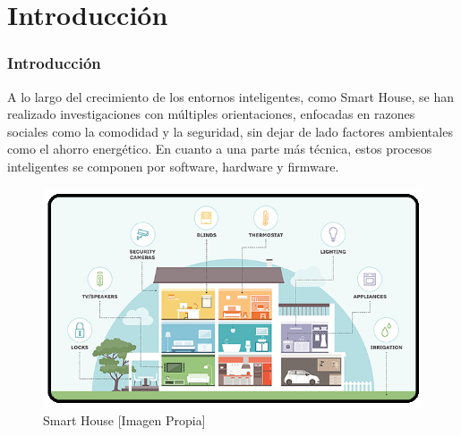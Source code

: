 \section{Introducción}
\begin{frame}
\frametitle{Introducción}
\footnotesize
 A lo largo del crecimiento de los entornos inteligentes, como Smart House, se han realizado investigaciones con múltiples orientaciones, enfocadas en razones sociales como la comodidad y la seguridad, sin dejar de lado factores ambientales como el ahorro energético. En cuanto a una parte más técnica, estos procesos inteligentes se componen por software, hardware y firmware.\newline
 
 \begin{figure}[!]
 	\centering
 	\caption{Smart House [Imagen Propia]}
 	\label{fig:intr}
 	\includegraphics[width=0.4\linewidth]{Imagenes/intro}
 \end{figure}
\end{frame}